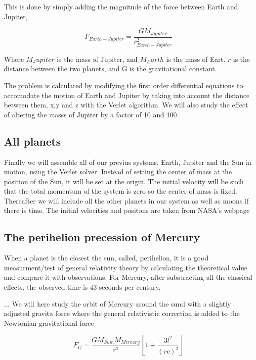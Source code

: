 \documentclass[../main.tex]{subfiles}
\begin{document}
This is done by simply adding the magnitude of the force between Earth and Jupiter,

\begin{equation}
  F_{Earth-Jupiter} = \frac{GM_{Jupiter}}{r^2_{Earth-Jupiter}}
\end{equation}

Where $M_Jupiter$ is the mass of Jupiter, and $M_Earth$ is the mass of Eart. $r$ is the distance between the two planets, and G is the gravitational constant.

The problem is calculated by modifying the first order differential equations to accomodate the motion of Earth and Jupiter by taking into account the distance between them, x,y and z with the Verlet algorithm. We will also study the effect of altering the masss of Jupiter by a factor of 10 and 100.

\subsection{All planets}
 Finally we will assemble all of our previus systems, Earth, Jupiter and the Sun in motion, using the Verlet solver. Instead of setting the center of mass at the position of the Sun, it will be set at the origin. The initial velocity will be such that the total momentum of the system is zero so the center of mass is fixed. Thereafter we will include all the other planets in our system as well as moons if there is time. The initial velocities and positons are taken from NASA's webpage \cite{HorizonsNASA}

\subsection{The perihelion precession of Mercury}
When a planet is the closest the sun, called, perihelion, it is a good measurment/test of general relativity theory by calculating the theoretical value and compare it with observations. For Mercury, after substracting all the classical effects, the observed time is 43 seconds per century.

...
We will here study the orbit of Mercury around the sund with a slightly adjusted gravita force where the general relativistic correction is added to the Newtonian gravitational force

\begin{equation}
  F_G = \frac{GM_{Sum}M_{Mercury}}{r^2} \left[ 1+\frac {3l^2}{(rc)^2} \right]
\end{equation}
\end{document}
